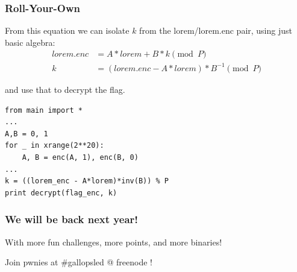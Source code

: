 \documentclass{beamer}
\begin{document}
\begin{frame}[fragile]
    \frametitle{Roll-Your-Own}
    From this equation we can isolate $k$ from the lorem/lorem.enc pair, using just basic algebra:
    \begin{align*}
         lorem.enc &= A * lorem + B * k \pmod{P} \\
         k &= (lorem.enc - A *lorem) * B^{-1} \pmod{P}
    \end{align*}

    \pause

    and use that to decrypt the flag.
    \begin{lstlisting}[style=custompy]
from main import *
...
A,B = 0, 1
for _ in xrange(2**20):
    A, B = enc(A, 1), enc(B, 0)
...
k = ((lorem_enc - A*lorem)*inv(B)) % P
print decrypt(flag_enc, k)
    \end{lstlisting}
\end{frame}

\begin{frame}
    \frametitle{We will be back next year!}
    
    With more fun challenges, more points, and more binaries!

    Join pwnies at \#gallopsled @ freenode !
\end{frame}
\end{document}
